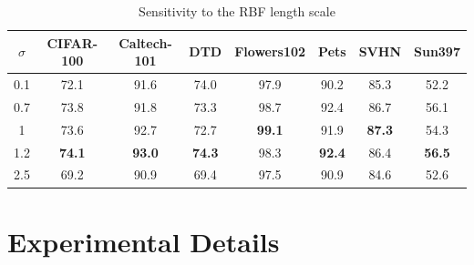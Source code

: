 \begin{table}[h]
\centering
\caption{Sensitivity to the RBF length scale}
\label{tab:rbflengthsensitivity}
\begin{tabular}{c|ccccccc}
\hline
$\sigma$ & CIFAR-100     & Caltech-101   & DTD           & Flowers102    & Pets          & SVHN          & Sun397        \\ \hline
0.1                   & 72.1          & 91.6          & 74.0          & 97.9          & 90.2          & 85.3          & 52.2          \\
0.7                   & 73.8          & 91.8          & 73.3          & 98.7          & 92.4          & 86.7          & 56.1          \\
1                     & 73.6          & 92.7          & 72.7          & \textbf{99.1} & 91.9          & \textbf{87.3} & 54.3          \\
1.2                   & \textbf{74.1} & \textbf{93.0} & \textbf{74.3} & 98.3          & \textbf{92.4} & 86.4          & \textbf{56.5} \\
2.5                   & 69.2          & 90.9          & 69.4          & 97.5          & 90.9          & 84.6          & 52.6          \\ \hline
\end{tabular}
\end{table}

\section{Experimental Details}
\label{appendix: experimental details}
